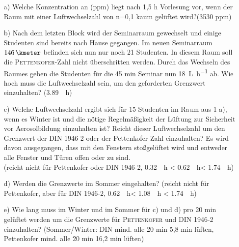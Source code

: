 \begin{enumerate}
	\item [a)] 	Welche Konzentration an  (ppm) liegt nach 1,5 h Vorlesung vor, wenn der Raum mit einer Luftwechselzahl von n=0,1 kaum gelüftet wird?{\scriptsize  (3530 ppm)}
	
	\item [b)] Nach dem letzten Block wird der Seminarraum gewechselt und einige Studenten sind bereits nach Hause gegangen. Im neuen Seminarraum $\SI{146}{\kmeter}$ befinden sich nun nur noch 21 Studenten. In diesem Raum soll die \textsc{Pettenkofer}-Zahl nicht überschritten werden. Durch das Wechseln des Raumes geben die Studenten für die 45 min Seminar nun \SI{18}{\liter \per \hour}   ab. 
	Wie hoch muss die Luftwechselzahl sein, um den geforderten Grenzwert einzuhalten? {\scriptsize (\SI{3,89}{\per \hour})}
	
	\item [c)] Welche Luftwechselzahl ergibt sich für 15 Studenten im Raum aus 1 a), wenn es Winter ist und die nötige Regelmäßigkeit der Lüftung zur Sicherheit vor Aerosolbildung einzuhalten ist? Reicht dieser Luftwechselzahl um den Grenzwert der DIN 1946-2 oder der Pettenkofer-Zahl einzuhalten?
	Es wird davon ausgegangen, dass mit den Fenstern stoßgelüftet wird und entweder alle Fenster und Türen offen oder zu sind.\\
	{\scriptsize (reicht nicht für Pettenkofer oder DIN 1946-2, \SI{0,32}{\per \hour} < \SI{0,62}{\per \hour}< \SI{1,74}{\per \hour})}
	
	\item [d)] Werden die Grenzwerte im Sommer eingehalten? 
	{\scriptsize (reicht nicht für Pettenkofer, aber für DIN 1946-2, \SI{0,62}{\per \hour}< \SI{1,08}{\per \hour} < \SI{1,74}{\per \hour})}
	
	\item [e)] Wie lang muss im Winter und im Sommer für c) und d) pro 20 min gelüftet werden um die Grenzwerte für \textsc{Pettenkofer} und DIN 1946-2 einzuhalten?
	{\scriptsize (Sommer/Winter: DIN mind. alle 20 min 5,8 min lüften, Pettenkofer mind. alle 20 min 16,2 min lüften)}
		
\end{enumerate}